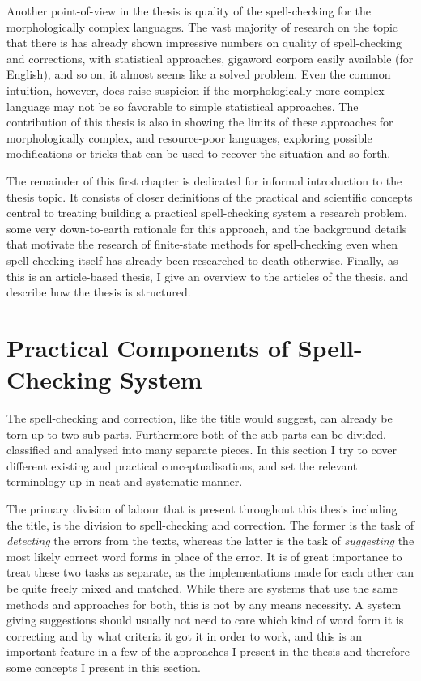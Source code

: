 \documentclass[officiallayout]{unihelcompling}
\begin{document}
Another point-of-view in the thesis is quality of the spell-checking for the
morphologically complex languages. The vast majority of research on the topic
that there is has already shown impressive numbers on quality of spell-checking
and corrections, with statistical approaches, gigaword corpora easily available
(for English), and so on, it almost seems like a solved problem. Even the
common intuition, however, does raise suspicion if the morphologically more
complex language may not be so favorable to simple statistical approaches. The
contribution of this thesis is also in showing the limits of these approaches
for morphologically complex, and resource-poor languages, exploring possible
modifications or tricks that can be used to recover the situation and so forth.

The remainder of this first chapter is dedicated for informal introduction to
the thesis topic. It consists of closer definitions of the practical and
scientific concepts central to treating building a practical spell-checking
system a research problem, some very down-to-earth rationale for this approach,
and the background details that motivate the research of finite-state methods
for spell-checking even when spell-checking itself has already been researched
to death otherwise. Finally, as this is an article-based thesis, I give an
overview to the articles of the thesis, and describe how the thesis is
structured.

\section{Practical Components of Spell-Checking System}
\label{sec:practical-components}

The spell-checking and correction, like the title would suggest, can already be
torn up to two sub-parts. Furthermore both of the sub-parts can be divided,
classified and analysed into many separate pieces. In this section I try to
cover different existing and practical conceptualisations, and set the relevant
terminology up in neat and systematic manner.

The primary division of labour that is present throughout this thesis including
the title, is the division to spell-checking and correction. The former is the
task of \emph{detecting} the errors from the texts, whereas the latter is the
task of \emph{suggesting} the most likely correct word forms in place of the
error. It is of great importance to treat these two tasks as separate, as the
implementations made for each other can be quite freely mixed and matched.
While there are systems that use the same methods and approaches for both,
this is not by any means necessity. A system giving suggestions should usually
not need to care which kind of word form it is correcting and by what criteria
it got it in order to work, and this is an important feature in a few of the
approaches I present in the thesis and therefore some concepts I present in
this section.
\end{document}

